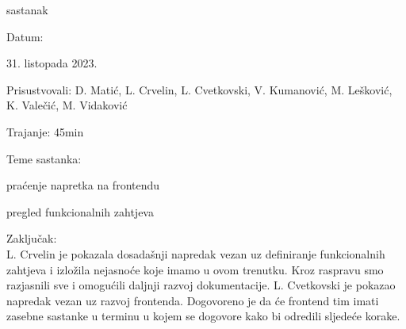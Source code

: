 \begin{packed_enum}
            \item  sastanak
			\item[] \begin{packed_item}
				\item Datum: \date[{31. listopada 2023.}
				\item Prisustvovali:  D. Matić, L. Crvelin, L. Cvetkovski, V. Kumanović, M. Lešković, K. Valečić, M. Vidaković
				\item Trajanje: 45min
				\item Teme sastanka:
				\begin{packed_item}
					\item  praćenje napretka na frontendu
					\item  pregled funkcionalnih zahtjeva
				\end{packed_item}
                \item Zaključak: \\
                L. Crvelin je pokazala dosadašnji napredak vezan uz definiranje funkcionalnih zahtjeva i izložila nejasnoće koje imamo u ovom trenutku. Kroz raspravu smo razjasnili sve i omogućili daljnji razvoj dokumentacije.
                L. Cvetkovski je pokazao napredak vezan uz razvoj frontenda. Dogovoreno je da će frontend tim imati zasebne sastanke u terminu u kojem se dogovore kako bi odredili sljedeće korake.
            
			\end{packed_item}


\end{packed_enum}
